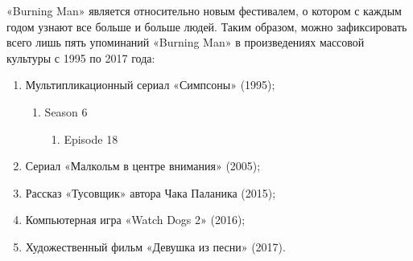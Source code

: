 \documentclass[10pt,a4paper]{report}
\begin{document}
«Burning Man» является относительно новым фестивалем, о котором с
каждым годом узнают все больше и больше людей. Таким образом,
можно зафиксировать всего лишь пять упоминаний «Burning Man» в
произведениях массовой культуры с 1995 по 2017 года:

\begin{enumerate}
\item Мультипликационный сериал «Симпсоны» (1995);
    \begin{enumerate}
        \item Season 6
        \begin{enumerate}
            \item Episode 18
        \end{enumerate}
    \end{enumerate}
\item Сериал «Малкольм в центре внимания» (2005);

\item Рассказ «Тусовщик» автора Чака Паланика (2015);

\item Компьютерная игра «Watch Dogs 2» (2016);

\item Художественный фильм «Девушка из песни» (2017).

\end{enumerate}
\end{document}
